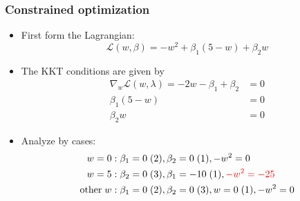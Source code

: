 \documentclass[10pt]{beamer}
\begin{document}
\begin{frame}
  \frametitle{Constrained optimization}
  \begin{itemize}
	\item First form the Lagrangian:
	\[\mathcal{L}(w,\beta) = -w^2 + \beta_1(5 - w) + \beta_2 w\]
	\pause
	\item The KKT conditions are given by
	\begin{align}
	\nabla_w\mathcal{L}(w,\lambda) = -2w -\beta_1 + \beta_2 &= 0 \\
	\beta_1(5-w) &= 0\\
	\beta_2 w &= 0
	\end{align}
	\pause
	\item Analyze by cases:
	\begin{align*}
	w = 0: \; & \beta_1 = 0 \; (2), \beta_2 = 0 \; (1), -w^2 = 0\\
	w = 5: \; & \beta_2 = 0 \; (3), \beta_1 = -10 \; (1), {\color{red} -w^2 = -25}\\
	\mathrm{other} \; w: \; & \beta_1 = 0 \; (2), \beta_2 = 0 \; (3), w = 0 \; (1), -w^2 = 0\\
	\end{align*}
  \end{itemize}
\end{frame}
\end{document}
